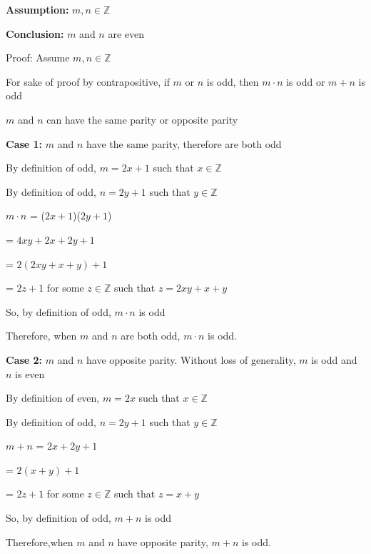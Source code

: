 \documentclass{article} %
\begin{document}


    \textbf{Assumption:} $m, n \in \mathbb{Z}$
    
    \textbf{Conclusion:} $m$ and $n$ are even

    Proof: Assume $m, n \in \mathbb{Z}$

    For sake of proof by contrapositive, if $m$ or $n$ is odd, then $m \cdot n$ is odd or $m+n$ is odd

    $m$ and $n$ can have the same parity or opposite parity

    \vspace*{0.1cm}

    \textbf{Case 1:} $m$ and $n$ have the same parity, therefore are both odd

    By definition of odd, $m = 2x + 1$ such that $x \in \mathbb{Z}$ 
    
    By definition of odd, $n = 2y + 1$ such that $y \in \mathbb{Z}$

    $m \cdot n$ = ($2x + 1$)($2y + 1$)

    \tabto*{1.42cm} = $4xy + 2x + 2y + 1$

    \tabto*{1.42cm} = $2(2xy + x + y) + 1$

    \tabto*{1.42cm} = $2z + 1$ for some $z \in \mathbb{Z}$ such that $z = 2xy + x + y$

    So, by definition of odd, $m \cdot n$ is odd

    Therefore, when $m$ and $n$ are both odd, $m \cdot n$ is odd.

    \vspace*{0.1cm}

    \textbf{Case 2:} $m$ and $n$ have opposite parity. Without loss of generality, $m$ is odd and $n$ is even

    By definition of even, $m = 2x$ such that $x \in \mathbb{Z}$ 
    
    By definition of odd, $n = 2y + 1$ such that $y \in \mathbb{Z}$

    $m + n$ = $2x + 2y + 1$

    \tabto*{1.6cm} = $2(x + y) + 1$

    \tabto*{1.6cm} = $2z + 1$ for some $z \in \mathbb{Z}$ such that $z = x + y$

    So, by definition of odd, $m + n$ is odd
    
    Therefore,when $m$ and $n$ have opposite parity, $m+n$ is odd.
\end{document}
